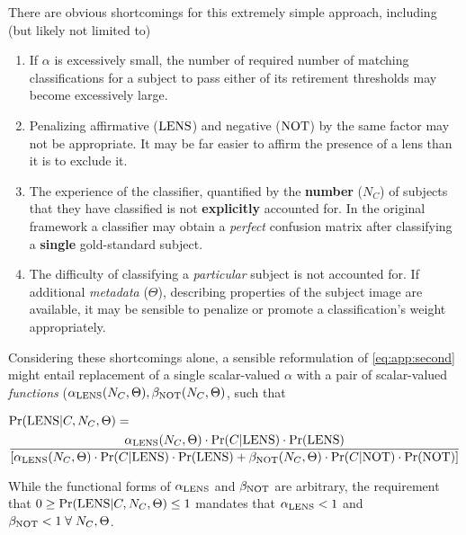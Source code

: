 \documentclass[]{article}
\begin{document}
There are obvious shortcomings for this extremely simple approach, including (but likely not limited to)
\begin{enumerate}
  \item If $\alpha$ is excessively small, the number of required number of matching classifications for a subject to pass either of its retirement thresholds may become excessively large.
  \item Penalizing affirmative (${\rm LENS}$) and negative (${\rm NOT}$) by the same factor may not be appropriate. It may be far easier to affirm the presence of a lens than it is to exclude it.
  \item The experience of the classifier, quantified by the \textbf{number} ($N_{C}$) of subjects that they have classified is not \textbf{explicitly} accounted for. In the original framework a classifier may obtain a \textit{perfect} confusion matrix after classifying a \textbf{single} gold-standard subject.
  \item The difficulty of classifying a \textit{particular} subject is not accounted for. If additional \textit{metadata} ($\Theta$), describing properties of the subject image are available, it may be sensible to penalize or promote a classification's weight appropriately.
\end{enumerate}

Considering these shortcomings alone, a sensible reformulation of \eqref{eq:app:second} might entail replacement of a single scalar-valued $\alpha$ with a pair of scalar-valued \textit{functions} ($\alpha_{{\rm LENS}}(N_{C}, \Theta), \beta_{{\rm NOT}}(N_{C}, \Theta)$, such that

\begin{align}
  \label{eq:app:third}
  & {\rm Pr}({\rm LENS}|C, N_{C}, \Theta) = \\ \notag
  & \frac{\alpha_{{\rm LENS}}(N_{C}, \Theta)\cdot{\rm Pr}(C|{\rm LENS})\cdot{\rm Pr}({\rm LENS})}
{\left[ \alpha_{{\rm LENS}}(N_{C}, \Theta)\cdot{\rm Pr}(C|{\rm LENS})\cdot{\rm Pr}({\rm LENS}) + \beta_{{\rm NOT}}(N_{C}, \Theta)\cdot{\rm Pr}(C|{\rm NOT})\cdot{\rm Pr}({\rm NOT}) \right]}
\end{align}

While the functional forms of $\alpha_{{\rm LENS}}$ and $\beta_{{\rm NOT}}$ are arbitrary, the requirement that $0 \geq {\rm Pr}({\rm LENS}|C, N_{C}, \Theta) \leq 1$ mandates that $\alpha_{{\rm LENS}} < 1$ and $\beta_{{\rm NOT}} < 1\;\forall\;N_{C}, \Theta$.
\end{document}

